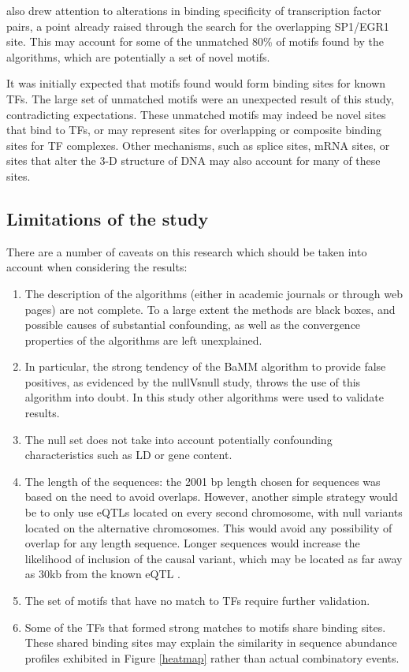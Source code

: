 \documentclass[12pt]{article}
\begin{document}
\citet{Jolma2015} also drew attention to alterations in binding specificity of transcription factor pairs, a point already raised through the search for the overlapping SP1/EGR1 site. This may account for some of the unmatched 80\% of motifs found by the algorithms, which are potentially a set of novel motifs.

It was initially expected that motifs found would form binding sites for known TFs. The large set of unmatched motifs were an unexpected result of this study, contradicting expectations. These unmatched motifs may indeed be novel sites that bind to TFs, or may represent sites for overlapping or composite binding sites for TF complexes. Other mechanisms, such as splice sites, mRNA sites, or sites that alter the 3-D structure of DNA may also account for many of these sites. 

\subsection{Limitations of the study}
There are a number of caveats on this research which should be taken into account when considering the results:
\begin{enumerate}
\item The description of the algorithms (either in academic journals or through web pages) are not complete. To a large extent the methods are black boxes, and possible causes of substantial confounding, as well as the convergence properties of the algorithms are left unexplained.
\item In particular, the strong tendency of the BaMM algorithm to provide false positives, as evidenced by the nullVsnull study, throws the use of this algorithm into doubt. In this study other algorithms were used to validate results.
\item The null set does not take into account potentially confounding characteristics such as LD or gene content. 
\item The length of the sequences: the 2001 bp length chosen for sequences was based on the need to avoid overlaps. However, another simple strategy would be to only use eQTLs located on every second chromosome, with null variants located on the alternative chromosomes. This would avoid any possibility of overlap for any length sequence. Longer sequences would increase the likelihood of inclusion of the causal variant, which may be located as far away as 30kb from the known eQTL \citep{}.
\item The set of motifs that have no match to TFs require further validation.
\item Some of the TFs that formed strong matches to motifs share binding sites. These shared binding sites may explain the similarity in sequence abundance profiles exhibited in Figure \ref{heatmap} rather than actual combinatory events.
\end{enumerate}
\end{document}
